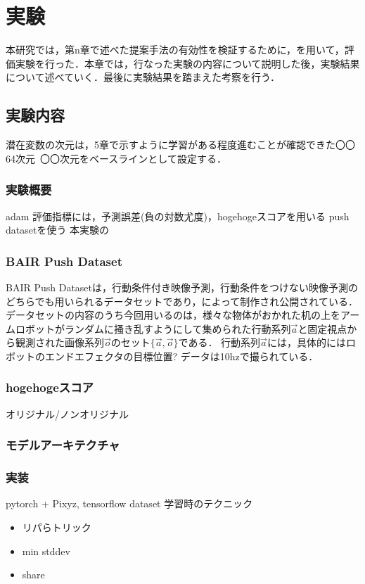 \chapter{実験}
\label{chap:experiment}
本研究では，第n章で述べた提案手法の有効性を検証するために，を用いて，評価実験を行った．本章では，行なった実験の内容について説明した後，実験結果について述べていく．最後に実験結果を踏まえた考察を行う．

\section{実験内容}
潜在変数の次元は，5章で示すように学習がある程度進むことが確認できた〇〇64次元~〇〇次元をベースラインとして設定する．

\subsection{実験概要}
adam
評価指標には，予測誤差(負の対数尤度)，hogehogeスコアを用いる
push datasetを使う
本実験の

\subsection{BAIR Push Dataset}
BAIR Push Datasetは，行動条件付き映像予測，行動条件をつけない映像予測のどちらでも用いられるデータセットであり，によって制作され公開されている．
データセットの内容のうち今回用いるのは，様々な物体がおかれた机の上をアームロボットがランダムに掻き乱すようにして集められた行動系列$\vec{a}$と固定視点から観測された画像系列$\vec{o}$のセット$\{\vec{a}, \vec{o}\}$である．
行動系列$\vec{a}$には，具体的にはロボットのエンドエフェクタの目標位置?
データは10hzで撮られている．

\subsection{hogehogeスコア}
オリジナル/ノンオリジナル
\subsection{モデルアーキテクチャ}
\subsection{}
\subsection{実装}
pytorch + Pixyz, tensorflow dataset
学習時のテクニック
\begin{itemize}
    \item リパらトリック
    \item min stddev
    \item share
\end{itemize}

